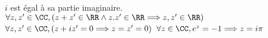 %
%
		\begin{tasks}
			\task $i$ est égal à sa partie imaginaire.
			\task $\forall z,z' \in \CC, ( z+z' \in \RR \wedge z.z' \in \RR \Longrightarrow z,z' \in \RR)$
			\task $\forall z,z' \in \CC, (z+iz' = 0 \Longrightarrow z = z' = 0)$
			\task $\forall z \in \CC, e^z = -1 \Longrightarrow z = i\pi$
		\end{tasks}
